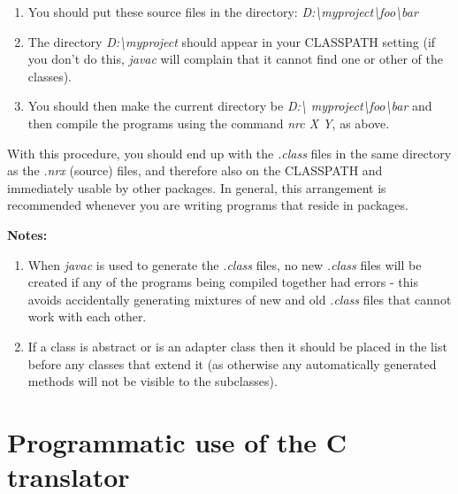 \begin{enumerate}
\item
You should put these source files in the directory:
\emph{D:\textbackslash myproject\textbackslash foo\textbackslash bar}
\item
The directory \emph{D:\textbackslash myproject} should appear in your CLASSPATH
setting (if you don't do this, \emph{javac} will complain that it cannot
find one or other of the classes).
\item
You should then make the current directory be \emph{D:\textbackslash
myproject\textbackslash foo\textbackslash bar}
and then compile the programs using the command \emph{nrc X Y},
as above.
\end{enumerate}

With this procedure, you should end up with the \emph{.class} files in
the same directory as the \emph{.nrx} (source) files, and therefore also
on the CLASSPATH and immediately usable by other packages.  In general,
this arrangement is recommended whenever you are writing programs that
reside in packages.

\textbf{Notes:}
\begin{enumerate}
\item
When \emph{javac} is used to generate the \emph{.class} files, no
new \emph{.class} files will be created if any of the programs being
compiled together had errors - this avoids accidentally generating
mixtures of new and old \emph{.class} files that cannot work with each
other.
\item
If a class is abstract or is an adapter class then it should be placed
in the list before any classes that extend it (as otherwise any
automatically generated methods will not be visible to the subclasses).
\end{enumerate}

\chapter{Programmatic use of the \nr{}C translator}


